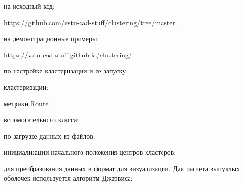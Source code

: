 
 на исходный код:
\begin{center}
    \url{https://github.com/vstu-cad-stuff/clustering/tree/master}.
\end{center}

 на демонстрационные примеры:
\begin{center}
    \url{https://vstu-cad-stuff.github.io/clustering/}.
\end{center}

 по настройке кластеризации и ее запуску:


\pagebreak
{} кластеризации:


\pagebreak
{} метрики Route:


\pagebreak
{} вспомогательного класса:


\pagebreak
{} по загрузке данных из файлов:


\pagebreak
{} инициализации начального положения центров кластеров:


\pagebreak
{} для преобразования данных в формат для визуализации. Для расчета выпуклых оболочек используется алгоритм Джарвиса:


